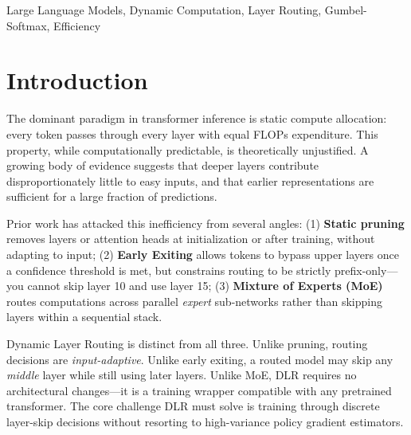 \documentclass[conference]{IEEEtran}
\begin{document}
\begin{IEEEkeywords}
Large Language Models, Dynamic Computation, Layer Routing, Gumbel-Softmax, Efficiency
\end{IEEEkeywords}

\section{Introduction}
The dominant paradigm in transformer inference is static compute allocation: every token passes through every layer with equal FLOPs expenditure. This property, while computationally predictable, is theoretically unjustified. A growing body of evidence suggests that deeper layers contribute disproportionately little to easy inputs, and that earlier representations are sufficient for a large fraction of predictions.

Prior work has attacked this inefficiency from several angles: (1) \textbf{Static pruning} removes layers or attention heads at initialization or after training, without adapting to input; (2) \textbf{Early Exiting} allows tokens to bypass upper layers once a confidence threshold is met, but constrains routing to be strictly prefix-only---you cannot skip layer 10 and use layer 15; (3) \textbf{Mixture of Experts (MoE)} routes computations across parallel \textit{expert} sub-networks rather than skipping layers within a sequential stack.

Dynamic Layer Routing is distinct from all three. Unlike pruning, routing decisions are \textit{input-adaptive}. Unlike early exiting, a routed model may skip any \textit{middle} layer while still using later layers. Unlike MoE, DLR requires no architectural changes---it is a training wrapper compatible with any pretrained transformer. The core challenge DLR must solve is training through discrete layer-skip decisions without resorting to high-variance policy gradient estimators.
\end{document}
